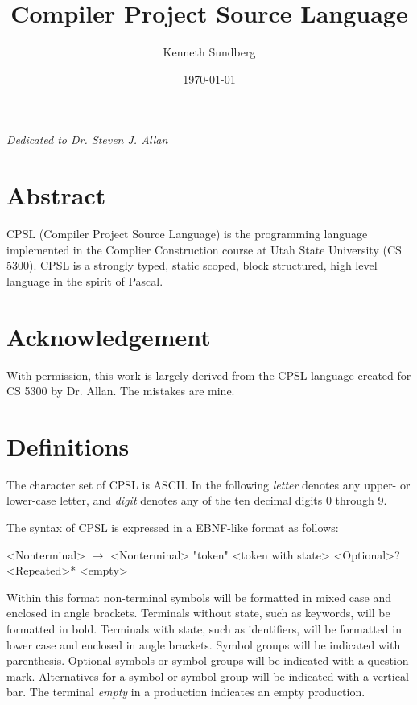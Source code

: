 \documentclass{book}
\title{Compiler Project Source Language}
\author{Kenneth Sundberg}
\date{\today}
\begin{document}
\frontmatter
\maketitle

\cleardoublepage
\thispagestyle{empty}
\begin{flushright}
\itshape
Dedicated to Dr. Steven J. Allan
\end{flushright}
\cleardoublepage

\chapter{Abstract}
CPSL (Compiler Project Source Language) is the programming language implemented in the Complier Construction course at Utah State University (CS 5300).
CPSL is a strongly typed, static scoped, block structured, high level language in the spirit of Pascal.

\chapter{Acknowledgement}
With permission, this work is largely derived from the CPSL language created for CS 5300 by Dr. Allan.  The mistakes are mine.

\tableofcontents
\listoftables
\mainmatter
\chapter{Definitions}


The character set of CPSL is ASCII.
In the following \textit{letter} denotes any upper- or lower-case letter, and \textit{digit} denotes any of the ten decimal digits 0 through 9.

The syntax of CPSL is expressed in a EBNF-like format as follows:
\begin{grammar}
<Nonterminal> $\rightarrow$ <Nonterminal> "token" <token with state>
\alt <Optional>? <Repeated>*
\alt <empty>
\end{grammar}
Within this format non-terminal symbols will be formatted in mixed case and enclosed in angle brackets.  Terminals without state, such as keywords, will be formatted in bold.  Terminals with state, such as identifiers, will be formatted in lower case and enclosed in angle brackets.  Symbol groups will be indicated with parenthesis.  Optional symbols or symbol groups will be indicated with a question mark.  Alternatives for a symbol or symbol group will be indicated with a vertical bar. The terminal \textit{empty} in a production indicates an empty production.
\end{document}
